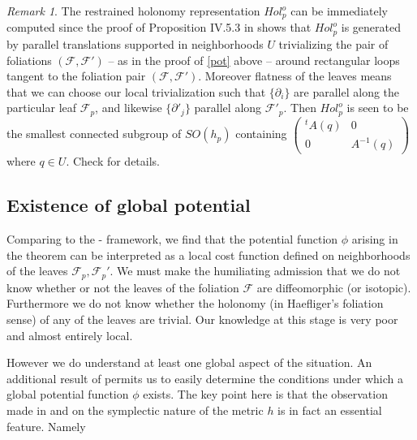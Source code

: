 \documentclass[12pt]{amsart}
\theoremstyle{definition}
\theoremstyle{remark}
\newtheorem{rem}[thm]{Remark}
\newcommand{\sF}{\mathscr{F}}
\newcommand{\del}{\partial}
\begin{document}
\begin{rem}
The restrained holonomy representation $Hol^o_p$ can be immediately computed since the proof of Proposition IV.5.3 in \cite{KN} shows that $Hol^o_p$ is generated by parallel translations supported in neighborhoods $U$ trivializing the pair of foliations $(\sF, \sF')$ -- as in the proof of \ref{pot} above -- around rectangular loops tangent to the foliation pair $(\sF, \sF')$. Moreover flatness of the leaves means that we can choose our local trivialization such that $\{\del_i\}$ are parallel along the particular leaf $\sF_p$, and likewise $\{\del'_j\}$ parallel along $\sF'_p$. Then $Hol^o_p$ is seen to be the smallest connected subgroup of $SO(h_p)$ containing $\begin{pmatrix} {}^tA(q) & 0 \\ 0 & A^{-1}(q)\end{pmatrix}$ where $q\in U$. Check \cite{BBI} for details.  
\end{rem}



\subsection{Existence of global potential}

Comparing to the \cite{KM}-\cite{KMW} framework, we find that the potential function $\phi$ arising in the theorem can be interpreted as a local cost function defined on neighborhoods of the leaves $\sF_p, \sF_p'$. We must make the humiliating admission that we do not know whether or not the leaves of the foliation $\sF$ are diffeomorphic (or isotopic). Furthermore we do not know whether the holonomy (in Haefliger's foliation sense) of any of the leaves are trivial. Our knowledge at this stage is very poor and almost entirely local.   

However we do understand at least one global aspect of the situation. An additional result of \cite{T} permits us to easily determine the conditions under which a global potential function $\phi$ exists. The key point here is that the observation made in \cite{KM} and \cite{KMW} on the symplectic nature of the metric $h$ is in fact an essential feature. Namely 
\end{document}

